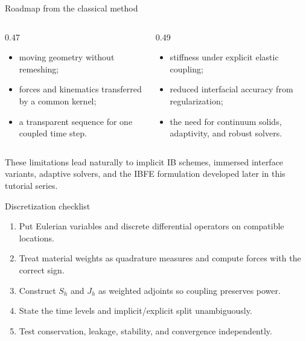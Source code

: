 \documentclass[aspectratio=169,11pt]{beamer}
\begin{document}
\begin{frame}{Roadmap from the classical method}
\begin{columns}[T,onlytextwidth]
\begin{column}{0.47\textwidth}
\begin{itemize}\itemsep4pt
  \item moving geometry without remeshing;
  \item forces and kinematics transferred by a common kernel;
  \item a transparent sequence for one coupled time step.
\end{itemize}
\end{column}
\begin{column}{0.49\textwidth}
\begin{itemize}\itemsep4pt
  \item stiffness under explicit elastic coupling;
  \item reduced interfacial accuracy from regularization;
  \item the need for continuum solids, adaptivity, and robust solvers.
\end{itemize}
\end{column}
\end{columns}
\begin{punchbox}
These limitations lead naturally to implicit IB schemes, immersed interface variants, adaptive solvers, and the IBFE formulation developed later in this tutorial series.
\end{punchbox}
\end{frame}

\begin{frame}{Discretization checklist}
\begin{enumerate}\itemsep7pt
  \item Put Eulerian variables and discrete differential operators on compatible locations.
  \item Treat material weights as quadrature measures and compute forces with the correct sign.
  \item Construct $S_h$ and $J_h$ as weighted adjoints so coupling preserves power.
  \item State the time levels and implicit/explicit split unambiguously.
  \item Test conservation, leakage, stability, and convergence independently.
\end{enumerate}
\end{frame}
\end{document}
